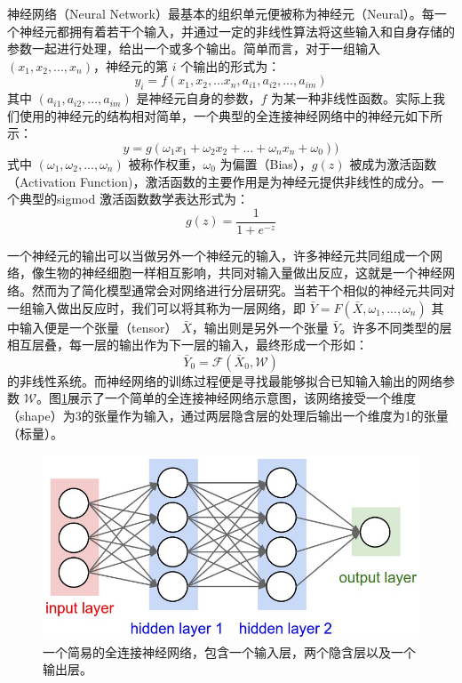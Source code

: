 神经网络（Neural Network）最基本的组织单元便被称为神经元（Neural）。每一个神经元都拥有着若干个输入，并通过一定的非线性算法将这些输入和自身存储的参数一起进行处理，给出一个或多个输出。简单而言，对于一组输入 $(x_1,x_2,...,x_n)$，神经元的第 $i$ 个输出的形式为：
$$ y_i= f(x_1,x_2,...x_n,a_{i1},a_{i2},...,a_{im})$$
其中 $(a_{i1},a_{i2},...,a_{im})$ 是神经元自身的参数，$f$ 为某一种非线性函数。实际上我们使用的神经元的结构相对简单，一个典型的全连接神经网络中的神经元如下所示：
\begin{equation}
     y=g(\omega_1 x_1+\omega_2 x_2 + ... + \omega_n x_n+ \omega_0))
     \label{eq:neural}
\end{equation}
式中 $(\omega_1,\omega_2,...,\omega_n)$ 被称作权重，$\omega_0$ 为偏置（Bias），$g(z)$ 被成为激活函数（Activation Function)，激活函数的主要作用是为神经元提供非线性的成分。一个典型的sigmod 激活函数数学表达形式为：
$$g(z)=\frac{1}{1+e^{-z}}$$

一个神经元的输出可以当做另外一个神经元的输入，许多神经元共同组成一个网络，像生物的神经细胞一样相互影响，共同对输入量做出反应，这就是一个神经网络。然而为了简化模型通常会对网络进行分层研究。当若干个相似的神经元共同对一组输入做出反应时，我们可以将其称为一层网络，即 $\bar Y = F( \bar X, \omega_1,...,\omega_n)$ 其中输入便是一个张量（tensor） $\bar X$，输出则是另外一个张量 $\bar Y$。许多不同类型的层相互层叠，每一层的输出作为下一层的输入，最终形成一个形如：
\begin{equation}
    \bar Y_0 = \mathcal{F}(\bar X_0, \mathcal{W})
\end{equation}
的非线性系统。而神经网络的训练过程便是寻找最能够拟合已知输入输出的网络参数 $\mathcal{W}$。图\ref{fig:simple_nn}展示了一个简单的全连接神经网络示意图，该网络接受一个维度（shape）为3的张量作为输入，通过两层隐含层的处理后输出一个维度为1的张量（标量）。

\begin{figure}
    \centering
    \includegraphics[width=0.7\columnwidth]{pic/simple_nn.jpeg}
    \caption{一个简易的全连接神经网络，包含一个输入层，两个隐含层以及一个输出层。}
    \label{fig:simple_nn}
\end{figure}

